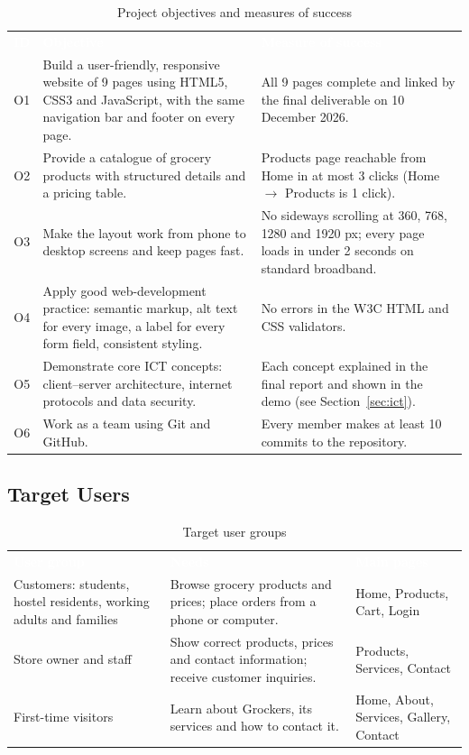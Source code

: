 \documentclass[10pt,a4paper]{article}
\newcommand{\hc}[1]{\textcolor{white}{\bfseries #1}}
\newcommand{\tbl}{\rowcolors{2}{white}{gkbg}\renewcommand{\arraystretch}{1.2}\footnotesize}
\begin{document}
\begin{table}[H]
\centering
\caption{Project objectives and measures of success}\label{tab:objectives}
\tbl
\begin{tabularx}{\textwidth}{@{}cY Y@{}}
\hc{ID} & \hc{Objective} & \hc{Measure of success}\\
O1 & Build a user-friendly, responsive website of 9 pages using HTML5, CSS3 and JavaScript, with the same navigation bar and footer on every page. & All 9 pages complete and linked by the final deliverable on 10 December 2026.\\
O2 & Provide a catalogue of grocery products with structured details and a pricing table. & Products page reachable from Home in at most 3 clicks (Home $\rightarrow$ Products is 1 click).\\
O3 & Make the layout work from phone to desktop screens and keep pages fast. & No sideways scrolling at 360, 768, 1280 and 1920 px; every page loads in under 2 seconds on standard broadband.\\
O4 & Apply good web-development practice: semantic markup, alt text for every image, a label for every form field, consistent styling. & No errors in the W3C HTML and CSS validators.\\
O5 & Demonstrate core ICT concepts: client--server architecture, internet protocols and data security. & Each concept explained in the final report and shown in the demo (see Section~\ref{sec:ict}).\\
O6 & Work as a team using Git and GitHub. & Every member makes at least 10 commits to the repository.\\
\end{tabularx}
\end{table}

\subsection{Target Users}
\begin{table}[H]
\centering
\caption{Target user groups}\label{tab:users}
\tbl
\begin{tabularx}{\textwidth}{@{}lYl@{}}
\hc{User group} & \hc{Needs} & \hc{Main pages}\\
Customers: students, hostel residents, working adults and families & Browse grocery products and prices; place orders from a phone or computer. & Home, Products, Cart, Login\\
Store owner and staff & Show correct products, prices and contact information; receive customer inquiries. & Products, Services, Contact\\
First-time visitors & Learn about Grockers, its services and how to contact it. & Home, About, Services, Gallery, Contact\\
\end{tabularx}
\end{table}
\end{document}
